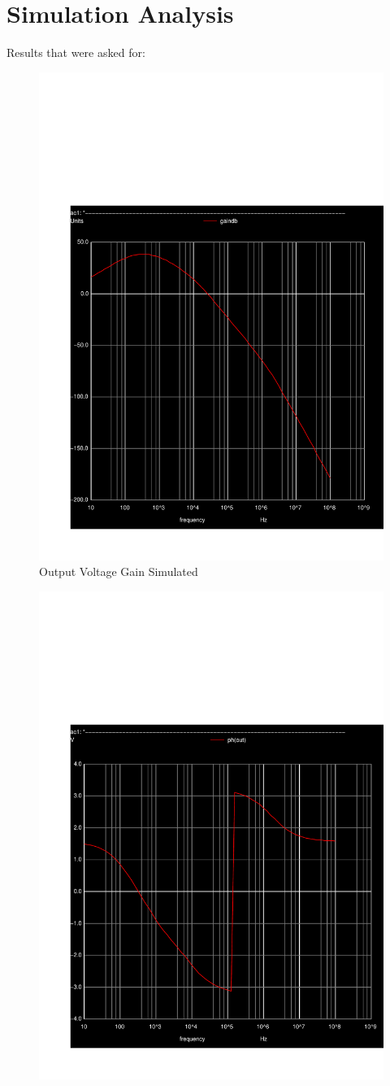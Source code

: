 \clearpage

\section{Simulation Analysis}
\label{sec:simulation}

Results that were asked for:

\begin{figure}[h] \centering
\includegraphics[width=0.5\linewidth]{../sim/gain.pdf}
\caption{Output Voltage Gain Simulated}
\label{fig:sim-gain}
\end{figure}

\begin{figure}[h] \centering
\includegraphics[width=0.5\linewidth]{../sim/phase.pdf}
\end{figure}

